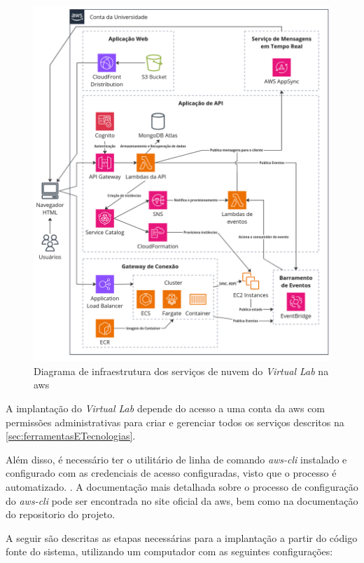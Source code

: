 \begin{figure}[H]
\caption{Diagrama de infraestrutura dos serviços de nuvem do \textit{Virtual Lab} na \gls{aws}}
\label{fig:diagramaDeinfraestruturaAws}
\includegraphics[width=\textwidth]{capitulos/2-metodologia/files/infra-diagram.png}
\end{figure}

A implantação do \textit{Virtual Lab} depende do acesso a uma conta da \gls{aws} com permissões administrativas para criar e gerenciar todos os serviços descritos na \autoref{sec:ferramentasETecnologias}. 

Além disso, é necessário ter o utilitário de linha de comando \textit{aws-cli} instalado e configurado com as credenciais de acesso configuradas, visto que o processo é automatizado. \citep{awsclidocs}. A documentação mais detalhada sobre o processo de configuração do \textit{aws-cli} pode ser encontrada no site oficial da \gls{aws}, bem como na documentação do repositorio do projeto.

A seguir são descritas as etapas necessárias para a implantação a partir do código fonte do sistema, utilizando um computador com as seguintes configurações:

